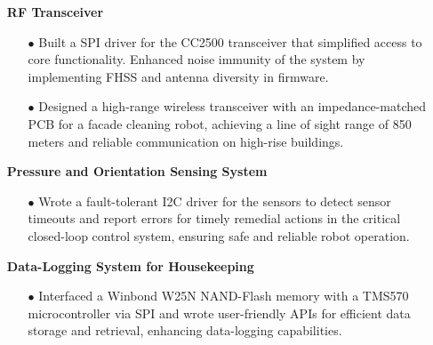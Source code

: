 \documentclass[11pt]{article}
\begin{document}
\begin{itemize}[leftmargin=0.01in]\setlength\itemsep{-5pt}
  \item[]  \textbf{RF Transceiver}
    \begin{itemize}\setlength{\itemsep}{0pt}\setlength{\parskip}{0pt}\vspace{-0.3em}
      \item[$\bullet$] Built a SPI driver for the CC2500 transceiver that simplified access to core functionality. Enhanced noise immunity of the system by implementing FHSS and antenna diversity in firmware.
      \item[$\bullet$] Designed a high-range wireless transceiver with an impedance-matched PCB for a facade cleaning robot, achieving a line of sight range of 850 meters and reliable communication on high-rise buildings.
    \end{itemize}
  \item[]  \textbf{Pressure and Orientation Sensing System}
    \begin{itemize}\setlength{\itemsep}{0pt}\setlength{\parskip}{0pt}\vspace{-0.3em}
      \item[$\bullet$] Wrote a fault-tolerant I2C driver for the sensors to detect sensor timeouts and report errors for timely remedial actions in the critical closed-loop control system, ensuring safe and reliable robot operation.
    \end{itemize}

  \item[]  \textbf{Data-Logging System for Housekeeping}
    \begin{itemize}\setlength{\itemsep}{0pt}\setlength{\parskip}{0pt}\vspace{-0.3em}
      \item[$\bullet$] Interfaced a Winbond W25N NAND-Flash memory with a TMS570 microcontroller via SPI and wrote user-friendly APIs for efficient data storage and retrieval, enhancing data-logging capabilities.
    \end{itemize}
\end{itemize}
\end{document}
